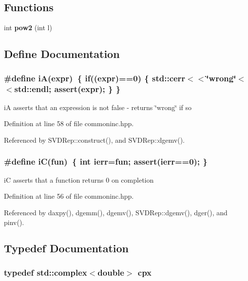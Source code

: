 \subsection*{Functions}
\begin{CompactItemize}
\item 
int {\bf pow2} (int l)
\end{CompactItemize}


\subsection{Define Documentation}
\subsubsection{\setlength{\rightskip}{0pt plus 5cm}\#define i\-A(expr)~\{ if((expr)==0) \{ std::cerr$<$$<$\char`\"{}wrong\char`\"{}$<$$<$std::endl; assert(expr); \} \}}\label{commoninc_8hpp_262164ca6c8e6852a77a08288e89991d_262164ca6c8e6852a77a08288e89991d}


i\-A asserts that an expression is not false - returns \char`\"{}wrong\char`\"{} if so 

Definition at line 58 of file commoninc.hpp.

Referenced by SVDRep::construct(), and SVDRep::dgemv().
\subsubsection{\setlength{\rightskip}{0pt plus 5cm}\#define i\-C(fun)~\{ int ierr=fun; assert(ierr==0); \}}\label{commoninc_8hpp_a84ea98a1635f0f20af7733b13389045_a84ea98a1635f0f20af7733b13389045}


i\-C asserts that a function returns 0 on completion 

Definition at line 56 of file commoninc.hpp.

Referenced by daxpy(), dgemm(), dgemv(), SVDRep::dgemv(), dger(), and pinv().

\subsection{Typedef Documentation}
\subsubsection{\setlength{\rightskip}{0pt plus 5cm}typedef std::complex$<$double$>$ {\bf cpx}}\label{commoninc_8hpp_18daf02e2b22e37361830dfc2e2aef26_18daf02e2b22e37361830dfc2e2aef26}


